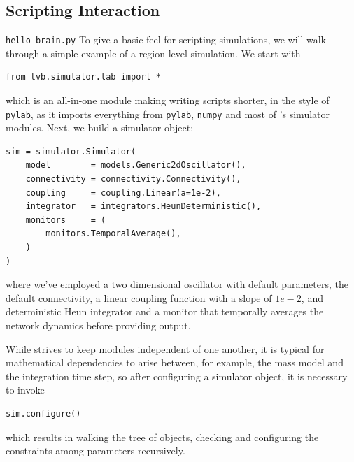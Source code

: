 \subsection{Scripting Interaction}

\texttt{hello\_brain.py}
To give a basic feel for scripting \TVB simulations, we will 
walk through a simple example of a region-level simulation. We 
start with

\begin{lstlisting}
from tvb.simulator.lab import *
\end{lstlisting}

\noindent which is an all-in-one module making writing scripts
shorter, in the style of \texttt{pylab}, as it imports everything
from \texttt{pylab}, \texttt{numpy} and most of \TVB's simulator
modules. Next, we build a simulator object:

\begin{lstlisting}
sim = simulator.Simulator(
    model        = models.Generic2dOscillator(), 
    connectivity = connectivity.Connectivity(),
    coupling     = coupling.Linear(a=1e-2),
    integrator   = integrators.HeunDeterministic(),
    monitors     = (
        monitors.TemporalAverage(), 
    )
)
\end{lstlisting}

\noindent where we've employed a two dimensional oscillator
with default parameters, the default connectivity, a linear 
coupling function with a slope of $1e-2$, and deterministic
Heun integrator and a monitor that temporally averages the 
network dynamics before providing output.

While \TVB strives to keep modules independent of one another,
it is typical for mathematical dependencies to arise between, 
for example, the mass model and the integration time step, so
after configuring a simulator object, it is necessary to invoke

\begin{lstlisting}
sim.configure()
\end{lstlisting}

which results in walking the tree of objects, checking and 
configuring the constraints among parameters recursively.

